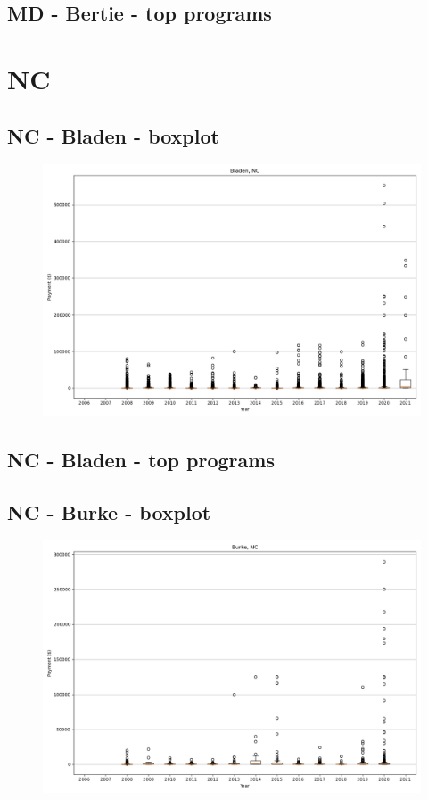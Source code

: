 \subsection*{MD - Bertie - top programs}

\newpage
\section*{NC}
\subsection*{NC - Bladen - boxplot}
\begin{figure}[h]
\centering
\includegraphics[width=7in]{../output/boxplots/counties/Bladen-NC_boxplot.png}
\end{figure}


\subsection*{NC - Bladen - top programs}

\newpage
\subsection*{NC - Burke - boxplot}
\begin{figure}[h]
\centering
\includegraphics[width=7in]{../output/boxplots/counties/Burke-NC_boxplot.png}
\end{figure}


